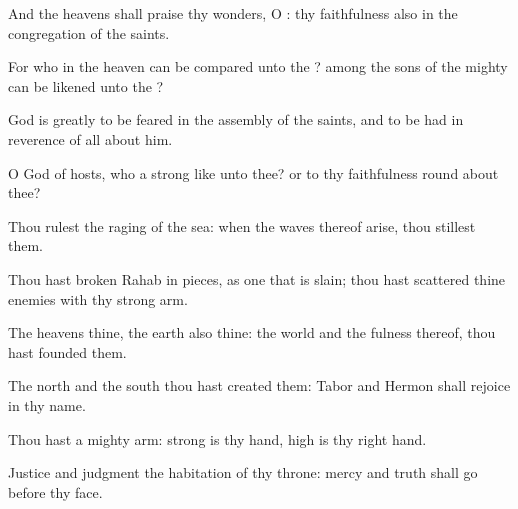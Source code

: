 {\Q {}And the
heavens shall
praise thy
wonders, O
{}: thy
faithfulness also in the
congregation of the
saints.


\par }{\Q {}For who in the
heaven can be
compared unto the
{}?
{} among the
sons of the
mighty can be
likened unto the
{}?


\par }{\Q {}God is
greatly to be
feared in the
assembly of the
saints, and to be had in
reverence of all
{}
about him.


\par }{\Q {}O
{}
God of
hosts, who
{} a
strong
{} like unto thee? or to thy
faithfulness round
about thee?


\par }{\Q {}Thou
rulest the
raging of the
sea: when the
waves thereof
arise, thou
stillest them.


\par }{\Q {}Thou hast
broken
Rahab in
pieces, as one that is
slain; thou hast
scattered thine
enemies with thy
strong
arm.


\par }{\Q {}The
heavens
{} thine, the
earth also
{} thine:
{} the
world and the
fulness thereof, thou hast
founded them.


\par }{\Q {}The
north and the
south thou hast
created them:
Tabor and
Hermon shall
rejoice in thy
name.


\par }{\Q {}Thou hast a
mighty
arm:
strong is thy
hand,
{}
high is thy right
hand.


\par }{\Q {}Justice and
judgment
{} the
habitation of thy
throne:
mercy and
truth shall
go before thy
face.


\par }{\BB \par }
